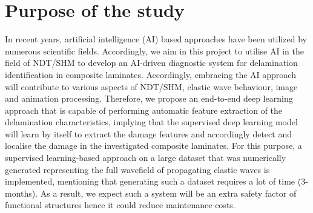 \section{Purpose of the study}
\label{sec12}
In recent years, artificial intelligence (AI) based approaches have been utilized by numerous scientific fields. 
Accordingly, we aim in this project to utilise AI in the field of NDT/SHM to develop an AI-driven diagnostic system for delamination identification in composite laminates. 
Accordingly, embracing the AI approach will contribute to various aspects of NDT/SHM, elastic wave behaviour, image and animation processing.
Therefore, we propose an end-to-end deep learning approach that is capable of performing automatic feature extraction of the delamination characteristics, implying that the supervised deep learning model will learn by itself to extract the damage features and accordingly detect and localise the damage in
the investigated composite laminates.
For this purpose, a supervised learning-based approach on a large dataset that was numerically generated representing the full wavefield of propagating elastic waves is implemented, mentioning that generating such a dataset requires a lot of time (3-months). 
As a result, we expect such a system will be an extra safety factor of functional structures hence it could reduce
maintenance costs.
